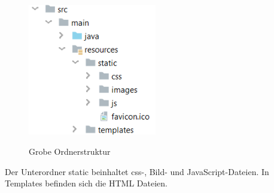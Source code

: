 \begin{figure}[H]
    \centering
    \begin{minipage}[H]{1\textwidth}
        \caption{Grobe Ordnerstruktur}
        \includegraphics[width=0.5\textwidth]{img/resources-ordner.png}\\
        \label{fig:resources-ordner}
    \end{minipage}
\end{figure}


Der Unterordner static beinhaltet css-, Bild- und JavaScript-Dateien. In Templates befinden sich die HTML Dateien.


